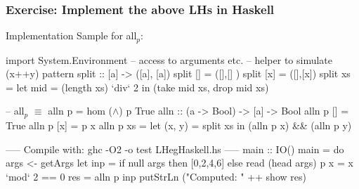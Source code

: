 \documentclass{beamer}
\renewcommand{\emph}[1]{\textcolor{structure}{#1}}
\newcommand{\emp}[1]{\textcolor{DikuRed}{ #1}}
\newcommand{\mymath}[1]{$ #1 $}
\newcommand{\myindx}[1]{_{#1}}
\begin{document}
\begin{frame}[fragile,t]
  \frametitle{Exercise: Implement the above LHs in Haskell}

\begin{block}{Implementation Sample for all$_p$:} 
\begin{colorcode}[fontsize=\scriptsize]
import System.Environment -- access to arguments etc.
-- helper to simulate (x++y) pattern
split :: [a] -> ([a], [a])
split []  = ([],[] )
split [x] = ([],[x]) 
split xs  = let mid = (length xs) `div` 2  in  (take mid xs, drop mid xs)

-- \emph{all\mymath{\myindx{p}}} \mymath{\equiv} \emph{alln p} = \emp{hom (\mymath{\wedge}) p True}
\emph{alln} :: (a -> Bool) -> [a] -> Bool
\emph{alln p} []     = True
\emph{alln p} [x]    = p x
\emph{alln p} xs     = let (x, y) = split xs   in   (\emph{alln p} x) && (\emph{alln p} y)

----- Compile with: ghc -O2 -o test LHegHaskell.hs -----
main :: IO()
main = do args <- getArgs
          let inp = if null args then [0,2,4,6] else read (head args)
              p x = x `mod` 2 == 0
              res = alln p inp  
          putStrLn ("Computed: " ++ show res)
\end{colorcode}
\end{block}
\end{frame}
\end{document}
